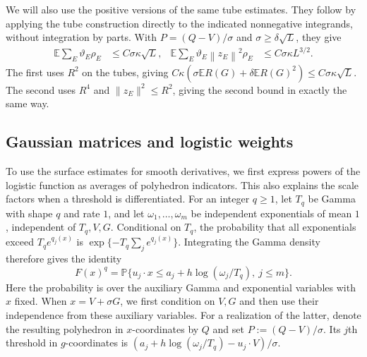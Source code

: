 \documentclass[11pt,letterpaper]{article}
\theoremstyle{remark}
\newcommand{\E}{\mathbb E}
\newcommand{\Pp}{\mathbb P}
\newcommand{\norm}[1]{\left\lVert#1\right\rVert}
\begin{document}
We will also use the positive versions of the same tube estimates.
They follow by applying the tube construction directly to the indicated
nonnegative integrands, without integration by parts. With $P=(Q-V)/\sigma$
and $\sigma\ge\delta\sqrt L$, they give
\begin{align}
 \E\sum_E\vartheta_E\rho_E&\le C\sigma\kappa\sqrt L,
 &\E\sum_E\vartheta_E\norm{z_E}^2\rho_E&\le C\sigma\kappa L^{3/2}.
 \label{hgap:eq:positive-edge}
\end{align}
The first uses $R^2$ on the tubes, giving
$C\kappa(\sigma\E R(G)+\delta\E R(G)^2)\le C\sigma\kappa\sqrt L$.
The second uses $R^4$ and $\|z_E\|^2\le R^2$, giving the second
bound in exactly the same way.

\subsection{Gaussian matrices and logistic weights}\label{hgap:sec:matrices}

To use the surface estimates for smooth derivatives, we first express
powers of the logistic function as averages of polyhedron indicators.
This also explains the scale factors when a threshold is differentiated.
For an integer
$q\ge1$, let $T_q$ be Gamma with shape $q$ and rate $1$, and let
$\omega_1,\ldots,\omega_m$ be independent exponentials of mean $1$,
independent of $T_q,V,G$. Conditional on $T_q$, the probability that all exponentials exceed
$T_qe^{q_j(x)}$ is $\exp\{-T_q\sum_j e^{q_j(x)}\}$. Integrating the
Gamma density therefore gives the identity
\begin{equation}
 F(x)^q=\Pp\{u_j\cdot x\le a_j+h\log(\omega_j/T_q),\ j\le m\}.
 \label{hgap:eq:mixture}
\end{equation}
Here the probability is over the auxiliary Gamma and exponential
variables with $x$ fixed. When $x=V+\sigma G$, we first condition on
$V,G$ and then use their independence from these auxiliary variables.
For a realization of the latter, denote the resulting polyhedron in
$x$-coordinates by $Q$ and set $P:=(Q-V)/\sigma$.
Its $j$th threshold in $g$-coordinates is
$(a_j+h\log(\omega_j/T_q)-u_j\cdot V)/\sigma$.
\end{document}
